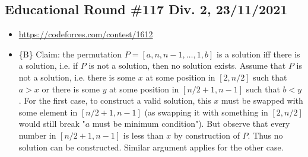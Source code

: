 \documentclass[titlepage, 12pt]{book}
\begin{document}
\subsection{Educational Round \#117 Div. 2, 23/11/2021}
\begin{itemize}
  \item\url{https://codeforces.com/contest/1612}
  \item \{B\} Claim: the permutation $P = [a, n, n - 1, \dots, 1, b]$ is a
    solution iff there is a solution, i.e. if $P$ is not a solution, then no
    solution exists. Assume that $P$ is not a solution, i.e. there is some $x$
    at some position in $[2, n / 2]$ such that $a > x$ or there is some $y$ at some
    position in $[n / 2 + 1, n - 1]$ such that $b < y$. For the first case, to
    construct a valid solution, this $x$ must be swapped with some element in
    $[n / 2 + 1, n - 1]$ (as swapping it with something in $[2, n / 2]$ would
    still break "$a$ must be minimum condition"). But observe that every number
    in $[n / 2 + 1, n - 1]$ is less than $x$ by construction of $P$. Thus no
    solution can be constructed. Similar argument applies for the other case.
\end{itemize}
\end{document}
